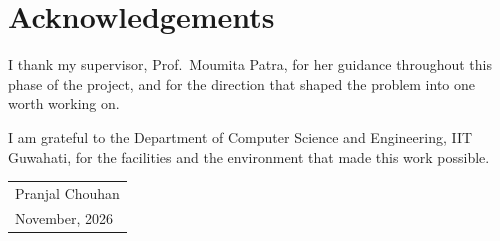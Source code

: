 \chapter*{Acknowledgements}
\vspace{0.5em}
\noindent
I thank my supervisor, Prof.\ Moumita Patra, for her guidance throughout this phase of the
project, and for the direction that shaped the problem into one worth working on.

\vspace{1em}
\noindent
I am grateful to the Department of Computer Science and Engineering, IIT Guwahati, for the
facilities and the environment that made this work possible.

\vspace{3em}
\noindent
\begin{tabular}{@{}l@{}}
  Pranjal Chouhan\\
  November, 2026
\end{tabular}

